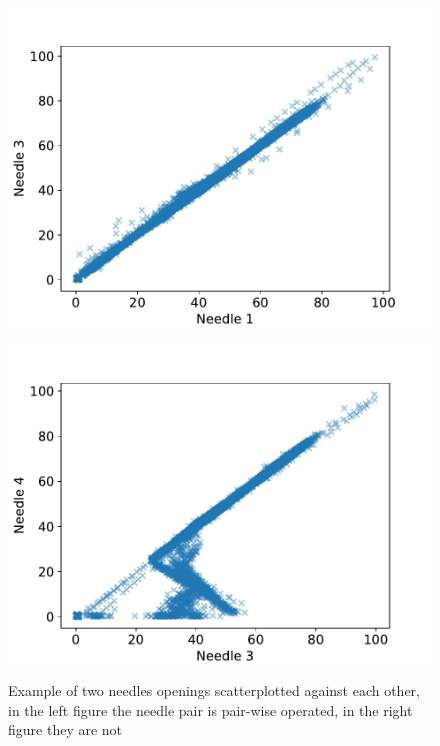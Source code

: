    \begin{figure}
        \begin{minipage}[b]{0.5\linewidth}
            \centering
            \includegraphics[width=\textwidth]{report/figures/data/Secondly samples needle [1,3] turbine 2 20170304:20170701.pdf}
            \label{fig:pairwise_neeldes}
        \end{minipage}
        \begin{minipage}[b]{0.5\linewidth}
            \centering
            \includegraphics[width=\textwidth]{report/figures/data/Secondly samples needle [3,4] turbine 2 20170304:20170701.pdf}
            \label{fig:not_pairwise_needles}
        \end{minipage}
        \caption{Example of two needles openings scatterplotted against each other, in the left figure the needle pair is pair-wise operated, in the right figure they are not}
        \label{fig:pairwise_needles}
    \end{figure}
    
